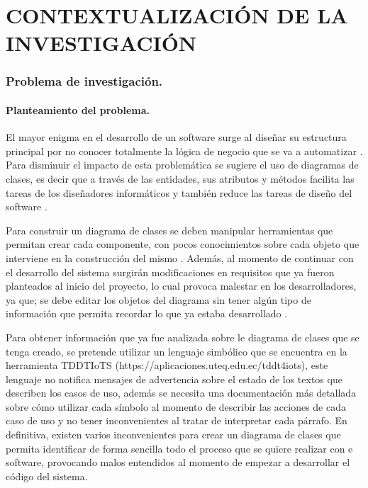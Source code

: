 \setcounter{chapter}{1}
\setcounter{section}{0}
\part{CONTEXTUALIZACIÓN DE LA INVESTIGACIÓN} 

\section{Problema de investigación.}

\subsection{Planteamiento del problema.}

El mayor enigma en el desarrollo de un software surge al diseñar su estructura principal por no conocer totalmente la lógica de negocio que se va a automatizar \cite{Weighted}.  Para disminuir el impacto de esta problemática se sugiere el uso de diagramas de clases, es decir que a través de las entidades, sus atributos y métodos facilita las tareas de los diseñadores informáticos y también reduce las tareas de diseño del software \cite{Management}.

Para construir un diagrama de clases se deben manipular herramientas que permitan crear cada componente, con pocos conocimientos sobre cada objeto que interviene en la construcción del mismo \cite{Management}. Además, al momento de continuar con el desarrollo del sistema surgirán modificaciones en requisitos que ya fueron planteados al inicio del proyecto, lo cual provoca malestar en los desarrolladores, ya que; se debe editar los objetos del diagrama sin tener algún tipo de información que permita recordar lo que ya estaba desarrollado \cite{case}.

Para obtener información que ya fue analizada sobre le diagrama de clases que se tenga creado, se pretende utilizar un lenguaje simbólico que se encuentra en la herramienta TDDTIoTS (https://aplicaciones.uteq.edu.ec/tddt4iots), este lenguaje no notifica mensajes de advertencia sobre el estado de los textos que describen los casos de uso, además se necesita una documentación más detallada sobre cómo utilizar cada símbolo al momento de describir las acciones de cada caso de uso y no tener inconvenientes al tratar de interpretar cada párrafo. En definitiva, existen varios inconvenientes para crear un diagrama de clases que permita identificar de forma sencilla todo el proceso que se quiere realizar con e software, provocando malos entendidos al momento de empezar a desarrollar el código del sistema.

